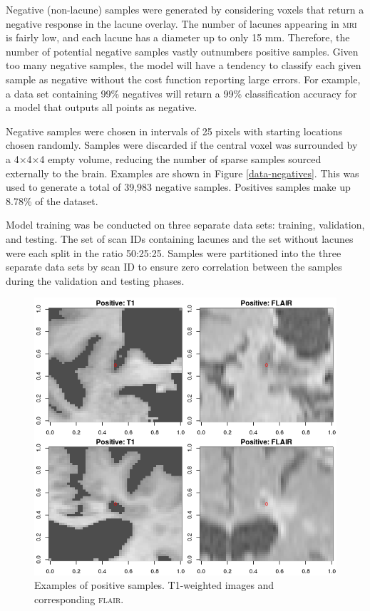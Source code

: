 Negative (non-lacune) samples were generated by considering voxels that return a negative response in the lacune overlay. The number of lacunes appearing in \textsc{mri} is fairly low, and each lacune has a diameter up to only 15 mm. Therefore, the number of potential negative samples vastly outnumbers positive samples. Given too many negative samples, the model will have a tendency to classify each given sample as negative without the cost function reporting large errors. For example, a data set containing 99\% negatives will return a 99\% classification accuracy for a model that outputs all points as negative.

Negative samples were chosen in intervals of 25 pixels with starting locations chosen randomly. Samples were discarded if the central voxel was surrounded by a 4$\times$4$\times$4 empty volume, reducing the number of sparse samples sourced externally to the brain. Examples are shown in Figure \ref{data-negatives}. This was used to generate a total of 39,983 negative samples. Positives samples make up 8.78\% of the dataset.

Model training was be conducted on three separate data sets: training, validation, and testing. The set of scan IDs containing lacunes and the set without lacunes were each split in the ratio 50:25:25. Samples were partitioned into the three separate data sets by scan ID to ensure zero correlation between the samples during the validation and testing phases.

\begin{figure}[hb]
\centering
\includegraphics[width=\linewidth]{Images/6_positives.png}
\caption{Examples of positive samples. T1-weighted images and corresponding \textsc{flair}.}
\label{data-positives}
\end{figure}



